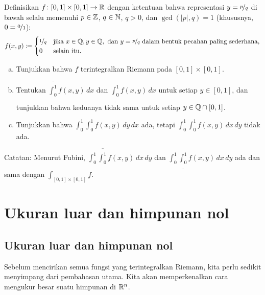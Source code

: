 \begin{exercise}
Definisikan $f \colon [0,1] \times [0,1] \to {\mathbb{R}}$ dengan ketentuan bahwa
representasi $y=\nicefrac{p}{q}$ di bawah selalu memenuhi
$p\in{\mathbb{Z}}$, $q\in{\mathbb{N}}$, $q>0$, dan $\gcd(|p|,q)=1$ (khususnya, $0=\nicefrac{0}{1}$):
\begin{equation*}
f(x,y) \coloneqq
\begin{cases}
\nicefrac{1}{q} & \text{jika } x \in {\mathbb{Q}}, y \in {\mathbb{Q}}, \text{ dan }
  y=\nicefrac{p}{q} \text{ dalam bentuk pecahan paling sederhana,} \\
0               & \text{selain itu.} 
\end{cases}
\end{equation*}
\begin{enumerate}[a)]
\item
Tunjukkan bahwa $f$ terintegralkan Riemann pada $[0,1] \times [0,1]$.
\item
Tentukan
$\overline{\int_0^1} f(x,y) \, dx$ dan
$\underline{\int_0^1} f(x,y) \, dx$ untuk setiap $y \in [0,1]$, dan tunjukkan
bahwa keduanya tidak sama untuk setiap $y \in {\mathbb{Q}} \cap [0,1]$.
\item
Tunjukkan bahwa
$\int_0^1 \int_0^1 f(x,y) \, dy \, dx$ ada, tetapi
$\int_0^1 \int_0^1 f(x,y) \, dx \, dy$ tidak ada.
\end{enumerate}
Catatan: Menurut Fubini,
$\int_0^1 \overline{\int_0^1} f(x,y) \, dx \, dy$ dan
$\int_0^1 \underline{\int_0^1} f(x,y) \, dx \, dy$ ada dan sama dengan
$\int_{[0,1]\times[0,1]} f$.
\end{exercise}


\sectionnewpage
\section{Ukuran luar dan himpunan nol}
\label{sec:outermeasure}



\subsection{Ukuran luar dan himpunan nol}

Sebelum mencirikan semua fungsi yang terintegralkan Riemann, kita perlu sedikit
menyimpang dari pembahasan utama. Kita akan memperkenalkan cara mengukur besar
suatu himpunan di ${\mathbb{R}}^n$.

